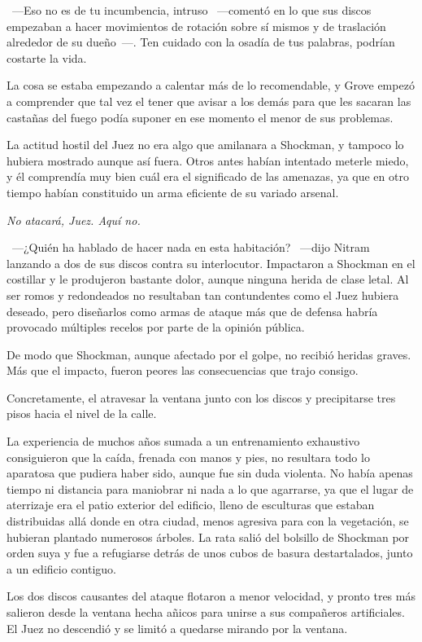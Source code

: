 ~---Eso no es de tu incumbencia, intruso ~---comentó en lo que sus discos empezaban a hacer movimientos de rotación sobre sí mismos y de traslación alrededor de su dueño~---. Ten cuidado con la osadía de tus palabras, podrían costarte la vida.

La cosa se estaba empezando a calentar más de lo recomendable, y Grove empezó a comprender que tal vez el tener que avisar a los demás para que les sacaran las castañas del fuego podía suponer en ese momento el menor de sus problemas.

La actitud hostil del Juez no era algo que amilanara a Shockman, y tampoco lo hubiera mostrado aunque así fuera. Otros antes habían intentado meterle miedo, y él comprendía muy bien cuál era el significado de las amenazas, ya que en otro tiempo habían constituido un arma eficiente de su variado arsenal.

\emph{No atacará, Juez. Aquí no.}

~---¿Quién ha hablado de hacer nada en esta habitación? ~---dijo Nitram lanzando a dos de sus discos contra su interlocutor. Impactaron a Shockman en el costillar y le produjeron bastante dolor, aunque ninguna herida de clase letal. Al ser romos y redondeados no resultaban tan contundentes como el Juez hubiera deseado, pero diseñarlos como armas de ataque más que de defensa habría provocado múltiples recelos por parte de la opinión pública.

De modo que Shockman, aunque afectado por el golpe, no recibió heridas graves. Más que el impacto, fueron peores las consecuencias que trajo consigo.

Concretamente, el atravesar la ventana junto con los discos y precipitarse tres pisos hacia el nivel de la calle.

La experiencia de muchos años sumada a un entrenamiento exhaustivo consiguieron que la caída, frenada con manos y pies, no resultara todo lo aparatosa que pudiera haber sido, aunque fue sin duda violenta. No había apenas tiempo ni distancia para maniobrar ni nada a lo que agarrarse, ya que el lugar de aterrizaje era el patio exterior del edificio, lleno de esculturas que estaban distribuidas allá donde en otra ciudad, menos agresiva para con la vegetación, se hubieran plantado numerosos árboles. La rata salió del bolsillo de Shockman por orden suya y fue a refugiarse detrás de unos cubos de basura destartalados, junto a un edificio contiguo.

Los dos discos causantes del ataque flotaron a menor velocidad, y pronto tres más salieron desde la ventana hecha añicos para unirse a sus compañeros artificiales. El Juez no descendió y se limitó a quedarse mirando por la ventana.

